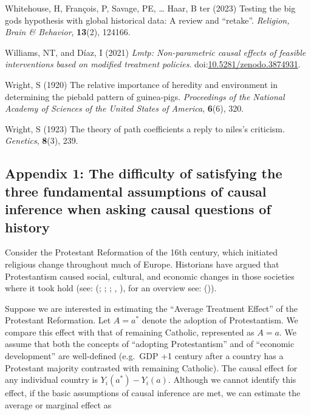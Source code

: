 \documentclass[
  singlecolumn,
  9pt]{article}
\begin{document}
\begin{CSLReferences}
Whitehouse, H, François, P, Savage, PE, \ldots{} Haar, B ter (2023)
Testing the big gods hypothesis with global historical data: A review
and {``}retake{''}. \emph{Religion, Brain \& Behavior}, \textbf{13}(2),
124166.

Williams, NT, and Díaz, I (2021) \emph{Lmtp: Non-parametric causal
effects of feasible interventions based on modified treatment policies}.
doi:\href{https://doi.org/10.5281/zenodo.3874931}{10.5281/zenodo.3874931}.

Wright, S (1920) The relative importance of heredity and environment in
determining the piebald pattern of guinea-pigs. \emph{Proceedings of the
National Academy of Sciences of the United States of America},
\textbf{6}(6), 320.

Wright, S (1923) The theory of path coefficients a reply to niles's
criticism. \emph{Genetics}, \textbf{8}(3), 239.

\end{CSLReferences}

\newpage{}

\subsection{Appendix 1: The difficulty of satisfying the three
fundamental assumptions of causal inference when asking causal questions
of
history}\label{appendix-1-the-difficulty-of-satisfying-the-three-fundamental-assumptions-of-causal-inference-when-asking-causal-questions-of-history-1}

Consider the Protestant Reformation of the 16th century, which initiated
religious change throughout much of Europe. Historians have argued that
Protestantism caused social, cultural, and economic changes in those
societies where it took hold (see: (; ;
; , ), for an overview see:
()).

Suppose we are interested in estimating the ``Average Treatment Effect''
of the Protestant Reformation. Let \(A = a^*\) denote the adoption of
Protestantism. We compare this effect with that of remaining Catholic,
represented as \(A = a\). We assume that both the concepts of ``adopting
Protestantism'' and of ``economic development'' are well-defined
(e.g.~GDP +1 century after a country has a Protestant majority
contrasted with remaining Catholic). The causal effect for any
individual country is \(Y_i(a^*) - Y_i(a)\). Although we cannot identify
this effect, if the basic assumptions of causal inference are met, we
can estimate the average or marginal effect as
\end{document}

